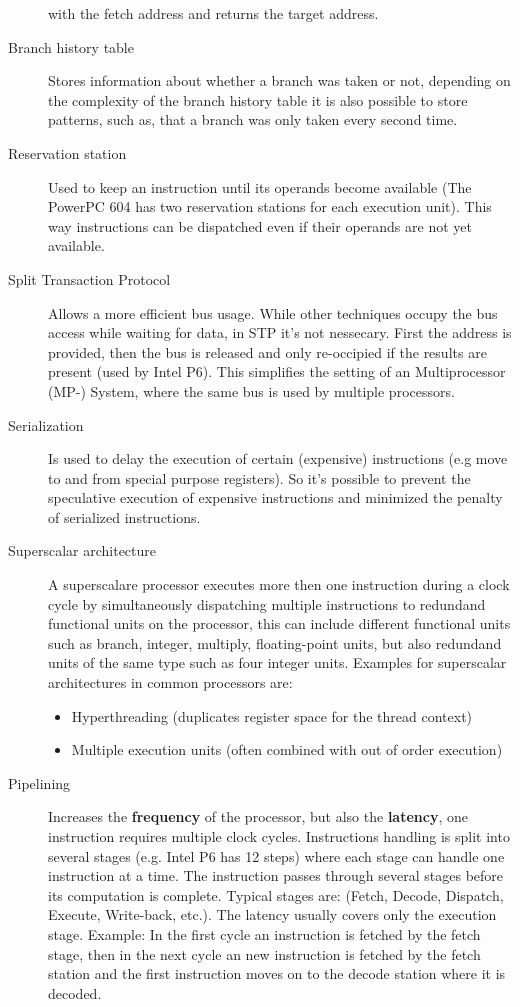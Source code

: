 \documentclass[a4paper,10pt]{article}
\begin{document}
\begin{description}
       with the fetch address and returns the target address.
 \item[Branch history table] Stores information about whether a branch was taken or not, depending on the complexity of the
       branch history table it is also possible to store patterns, such as, that a branch was only taken every second time.
 \item[Reservation station] Used to keep an instruction until its operands become available (The PowerPC 604 has two
       reservation stations for each execution unit). This way instructions can be dispatched even if their operands are not yet
       available.
 \item[Split Transaction Protocol] Allows a more efficient bus usage. While other techniques occupy the bus access while waiting for data, in STP it's not nessecary. First the address is provided, then the bus is released and only re-occipied if the results are present (used by Intel P6). This simplifies the setting of an Multiprocessor (MP-) System, where the same bus is used by multiple processors.
 \item[Serialization] Is used to delay the execution of certain (expensive) instructions (e.g move to and from special purpose registers). So it's possible to prevent the speculative execution of expensive instructions and minimized the penalty of serialized instructions.
 \item[Superscalar architecture] A superscalare processor executes more then one instruction during a clock cycle by
       simultaneously dispatching multiple instructions to redundand functional units on the processor, this can include different
       functional units such as branch, integer, multiply, floating-point units, but also redundand units
       of the same type such as four integer units. Examples for superscalar architectures in common processors are:
	\begin{itemize}
	    \item Hyperthreading (duplicates register space for the thread context)
	    \item Multiple execution units (often combined with out of order execution)
	\end{itemize}
  \item[Pipelining] Increases the \textbf{frequency} of the processor, but also the \textbf{latency}, one instruction requires
multiple clock cycles. Instructions handling is split into several stages (e.g. Intel P6 has 12 steps) where each stage can handle one instruction at a time. The
instruction passes through several stages before its computation is complete. Typical stages are: (Fetch, Decode, Dispatch, Execute,
Write-back, etc.)\cite{powerpc}. The latency usually covers only the execution stage. Example: In the first cycle an instruction is fetched by the
fetch stage, then in the next cycle an new instruction is fetched by the fetch station and the first instruction moves on to the decode
station where it is decoded.


\end{description}
\end{document}
